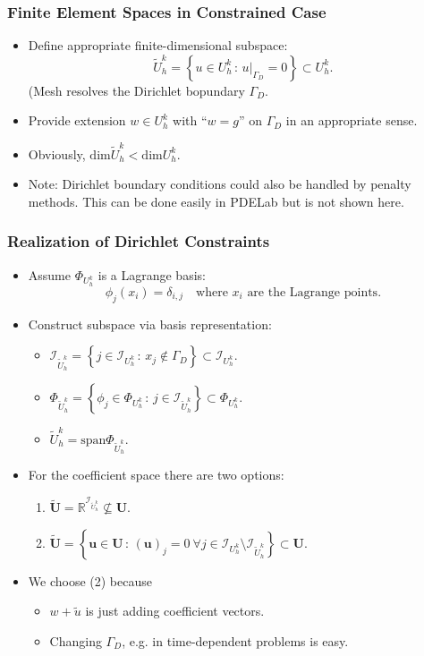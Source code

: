 \begin{frame}
\frametitle{Finite Element Spaces in Constrained Case}
\begin{itemize}
\item Define appropriate finite-dimensional subspace:
\begin{equation*}
\tilde{U}_h^k = \left \{ u \in U_h^k \,:\, u|_{\Gamma_D} = 0 \right\} \subset U_h^k.
\end{equation*}
(Mesh resolves the Dirichlet bopundary $\Gamma_D$.
\item Provide extension $w\in U_h^k$ with ``$w=g$'' on $\Gamma_D$ in an appropriate sense.
\item Obviously, $\text{dim}\tilde{U}_h^k < \text{dim} U_h^k$.
\item Note: Dirichlet boundary conditions could also be handled by penalty methods. 
This can be done easily in PDELab but is not shown here. 
\end{itemize}
\end{frame}

\begin{frame}
\frametitle{Realization of Dirichlet Constraints}
\begin{itemize}
\item Assume $\Phi_{U_h^k}$ is a Lagrange basis: 
\begin{equation*}
\phi_j(x_i)=\delta_{i,j} \quad\text{where $x_i$ are the Lagrange points}.
\end{equation*}
\item Construct subspace via basis representation:
\begin{itemize}
\item $\mathcal{I}_{\tilde{U}_h^k} = \left\{ j\in \mathcal{I}_{U_h^k} \,:\, 
x_j \not\in \Gamma_D \right\} \subset \mathcal{I}_{U_h^k}$.
\item $\Phi_{\tilde{U}_h^k} = \left\{ \phi_j\in \Phi_{U_h^k} \,:\, 
j \in \mathcal{I}_{\tilde{U}_h^k} \right\} \subset \Phi_{U_h^k}$.
\item $\tilde{U}_h^k = \text{span}\Phi_{\tilde{U}_h^k}$.
\end{itemize}
\item For the coefficient space there are two options:
\begin{enumerate}
\item $\tilde{\mathbf{U}} = \mathbb{R}^{\mathcal{I}_{\tilde{U}_h^k}} \not\subseteq \mathbf{U}$.
\item $\tilde{\mathbf{U}} = \left\{ \mathbf{u}\in\mathbf{U} \,:\, (\mathbf{u})_j = 0 \  \forall
j \in \mathcal{I}_{U_h^k} \setminus \mathcal{I}_{\tilde{U}_h^k} \right\} \subset \mathbf{U}$. 
\end{enumerate}
\item We choose (2) because
\begin{itemize}
\item $w + \tilde{u}$ is just adding coefficient vectors.
\item Changing $\Gamma_D$, e.g. in time-dependent problems is easy.
\end{itemize}
\end{itemize}
\end{frame}


